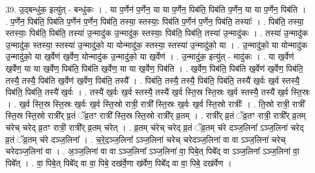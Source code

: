 \documentclass[17pt]{extarticle}
\begin{document}
39. उ॒द्बन्धु॑क॒ इत्यु॑त् - बन्धु॑कः । . या प॒र्णेन॑ प॒र्णेन॒ या या प॒र्णेन॒ पिब॑ति॒ पिब॑ति प॒र्णेन॒ या या प॒र्णेन॒ पिब॑ति । . प॒र्णेन॒ पिब॑ति॒ पिब॑ति प॒र्णेन॑ प॒र्णेन॒ पिब॑ति॒ तस्या॒ स्तस्याः॒ पिब॑ति प॒र्णेन॑ प॒र्णेन॒ पिब॑ति॒ तस्याः᳚ । . पिब॑ति॒ तस्या॒ स्तस्याः॒ पिब॑ति॒ पिब॑ति॒ तस्या॑ उ॒न्मादु॑क उ॒न्मादु॑क॒ स्तस्याः॒ पिब॑ति॒ पिब॑ति॒ तस्या॑ उ॒न्मादु॑कः । . तस्या॑ उ॒न्मादु॑क उ॒न्मादु॑क॒ स्तस्या॒ स्तस्या॑ उ॒न्मादु॑को॒ या योन्मादु॑क॒ स्तस्या॒ स्तस्या॑ उ॒न्मादु॑को॒ या । . उ॒न्मादु॑को॒ या योन्मादु॑क उ॒न्मादु॑को॒ या ख॒र्वेण॑ ख॒र्वेण॒ योन्मादु॑क उ॒न्मादु॑को॒ या ख॒र्वेण॑ । . उ॒न्मादु॑क॒ इत्यु॑त् - मादु॑कः । . या ख॒र्वेण॑ ख॒र्वेण॒ या या ख॒र्वेण॒ पिब॑ति॒ पिब॑ति ख॒र्वेण॒ या या ख॒र्वेण॒ पिब॑ति । . ख॒र्वेण॒ पिब॑ति॒ पिब॑ति ख॒र्वेण॑ ख॒र्वेण॒ पिब॑ति॒ तस्यै॒ तस्यै॒ पिब॑ति ख॒र्वेण॑ ख॒र्वेण॒ पिब॑ति॒ तस्यै᳚ । . पिब॑ति॒ तस्यै॒ तस्यै॒ पिब॑ति॒ पिब॑ति॒ तस्यै॑ ख॒र्वः ख॒र्व स्तस्यै॒ पिब॑ति॒ पिब॑ति॒ तस्यै॑ ख॒र्वः । . तस्यै॑ ख॒र्वः ख॒र्व स्तस्यै॒ तस्यै॑ ख॒र्व स्ति॒स्र स्ति॒स्रः ख॒र्व स्तस्यै॒ तस्यै॑ ख॒र्व स्ति॒स्रः । . ख॒र्व स्ति॒स्र स्ति॒स्रः ख॒र्वः ख॒र्व स्ति॒स्रो रात्री॒ रात्री᳚ स्ति॒स्रः ख॒र्वः ख॒र्व स्ति॒स्रो रात्रीः᳚ । . ति॒स्रो रात्री॒ रात्री᳚ स्ति॒स्र स्ति॒स्रो रात्री᳚र् व्र॒तं ॅव्र॒तꣳ रात्री᳚ स्ति॒स्र स्ति॒स्रो रात्री᳚र् व्र॒तम् । . रात्री᳚र् व्र॒तं ॅव्र॒तꣳ रात्री॒ रात्री᳚र् व्र॒तम् च॑रेच् चरेद् व्र॒तꣳ रात्री॒ रात्री᳚र् व्र॒तम् च॑रेत् । . व्र॒तम् च॑रेच् चरेद् व्र॒तं ॅव्र॒तम् च॑रे दञ्ज॒लिना᳚ ऽञ्ज॒लिना॑ चरेद् व्र॒तं ॅव्र॒तम् च॑रे दञ्ज॒लिना᳚ । . च॒रे॒द॒ञ्ज॒लिना᳚ ऽञ्ज॒लिना॑ चरेच् चरेदञ्ज॒लिना॑ वा वा ऽञ्ज॒लिना॑ चरेच् चरेदञ्ज॒लिना॑ वा । . अ॒ञ्ज॒लिना॑ वा वा ऽञ्ज॒लिना᳚ ऽञ्ज॒लिना॑ वा॒ पिबे॒त् पिबे᳚द् वा ऽञ्ज॒लिना᳚ ऽञ्ज॒लिना॑ वा॒ पिबे᳚त् । . वा॒ पिबे॒त् पिबे᳚द् वा वा॒ पिबे॒ दख॑र्वे॒णा ख॑र्वेण॒ पिबे᳚द् वा वा॒ पिबे॒ दख॑र्वेण । \newline
\end{document}
